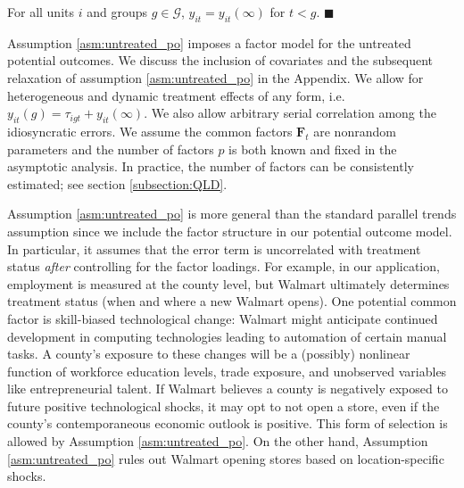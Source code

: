 \documentclass[12pt]{article}
\begin{document}
\begin{assumption}\label{asm:no_anticipation}
For all units $i$ and groups $g \in \mathcal{G}$, $y_{it} = y_{it}(\infty)$ for $t < g$. $\blacksquare$ %
\end{assumption}

Assumption \ref{asm:untreated_po} imposes a factor model for the untreated potential outcomes. We discuss the inclusion of covariates and the subsequent relaxation of assumption \ref{asm:untreated_po} in the Appendix. We allow for heterogeneous and dynamic treatment effects of any form, i.e. $y_{it}(g) = \tau_{igt} + y_{it}(\infty)$. We also allow arbitrary serial correlation among the idiosyncratic errors. We assume the common factors $\bm{F}_t$ are nonrandom parameters and the number of factors $p$ is both known and fixed in the asymptotic analysis. In practice, the number of factors can be consistently estimated; see section \ref{subsection:QLD}. 

Assumption \ref{asm:untreated_po} is more general than the standard parallel trends assumption since we include the factor structure in our potential outcome model. 
In particular, it assumes that the error term is uncorrelated with treatment status \emph{after} controlling for the factor loadings. For example, in our application, employment is measured at the county level, but Walmart ultimately determines treatment status (when and where a new Walmart opens). 
One potential common factor is skill-biased technological change: Walmart might anticipate continued development in computing technologies leading to automation of certain manual tasks. 
A county's exposure to these changes will be a (possibly) nonlinear function of workforce education levels, trade exposure, and unobserved variables like entrepreneurial talent. 
If Walmart believes a county is negatively exposed to future positive technological shocks, it may opt to not open a store, even if the county's contemporaneous economic outlook is positive. 
This form of selection is allowed by Assumption \ref{asm:untreated_po}.
On the other hand, Assumption \ref{asm:untreated_po} rules out Walmart opening stores based on location-specific shocks.
\end{document}
